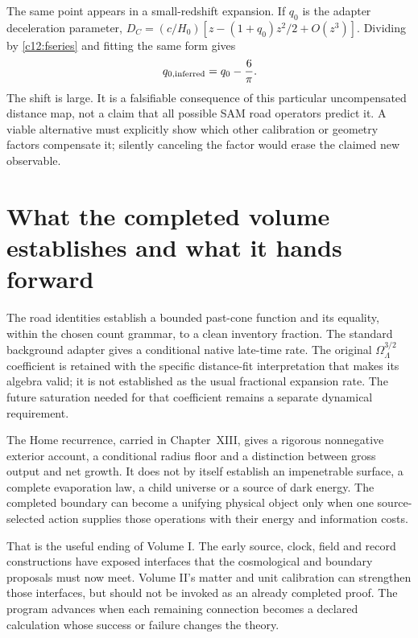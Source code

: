 The same point appears in a small-redshift expansion. If $q_0$ is the adapter deceleration parameter, $D_C=(c/H_0)[z-(1+q_0)z^2/2+O(z^3)]$. Dividing by \eqref{c12:fseries} and fitting the same form gives
\begin{equation}
 q_{0,\rm inferred}=q_0-\frac6\pi.
 \label{c12:qshift}
\end{equation}
The shift is large. It is a falsifiable consequence of this particular uncompensated distance map, not a claim that all possible SAM road operators predict it. A viable alternative must explicitly show which other calibration or geometry factors compensate it; silently canceling the factor would erase the claimed new observable.

\section{What the completed volume establishes and what it hands forward}
The road identities establish a bounded past-cone function and its equality, within the chosen count grammar, to a clean inventory fraction. The standard background adapter gives a conditional native late-time rate. The original $\Omega_\Lambda^{3/2}$ coefficient is retained with the specific distance-fit interpretation that makes its algebra valid; it is not established as the usual fractional expansion rate. The future saturation needed for that coefficient remains a separate dynamical requirement.

The Home recurrence, carried in Chapter~XIII, gives a rigorous nonnegative exterior account, a conditional radius floor and a distinction between gross output and net growth. It does not by itself establish an impenetrable surface, a complete evaporation law, a child universe or a source of dark energy. The completed boundary can become a unifying physical object only when one source-selected action supplies those operations with their energy and information costs.

That is the useful ending of Volume I. The early source, clock, field and record constructions have exposed interfaces that the cosmological and boundary proposals must now meet. Volume II's matter and unit calibration can strengthen those interfaces, but should not be invoked as an already completed proof. The program advances when each remaining connection becomes a declared calculation whose success or failure changes the theory.

